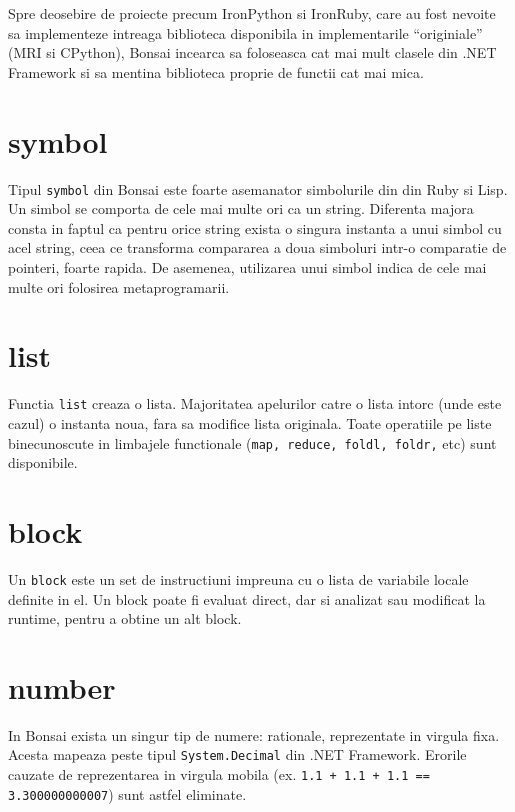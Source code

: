 \documentclass[12pt,a4paper]{memoir}
\begin{document}
Spre deosebire de proiecte precum IronPython si IronRuby, care au fost nevoite sa implementeze intreaga biblioteca disponibila in implementarile ``originiale'' (MRI si CPython), Bonsai incearca sa foloseasca cat mai mult clasele din .NET Framework si sa mentina biblioteca proprie de functii cat mai mica.

\section{symbol}

Tipul \texttt{symbol} din Bonsai este foarte asemanator simbolurile din din Ruby\cite{ruby_symbols} si Lisp\cite{clhs_symbols}. Un simbol se comporta de cele mai multe ori ca un string. Diferenta majora consta in faptul ca pentru orice string exista o singura instanta a unui simbol cu acel string, ceea ce transforma compararea a doua simboluri intr-o comparatie de pointeri, foarte rapida. De asemenea, utilizarea unui simbol indica de cele mai multe ori folosirea metaprogramarii. 

\section{list}

Functia \texttt{list} creaza o lista. Majoritatea apelurilor catre o lista intorc (unde este cazul) o instanta noua, fara sa modifice lista originala. Toate operatiile pe liste binecunoscute in limbajele functionale (\texttt{map, reduce, foldl, foldr,} etc) sunt disponibile.

\section{block}

Un \texttt{block} este un set de instructiuni impreuna cu o lista de variabile locale definite in el. Un block poate fi evaluat direct, dar si analizat sau modificat la runtime, pentru a obtine un alt block.

\section{number}

In Bonsai exista un singur tip de numere: rationale, reprezentate in virgula fixa. Acesta mapeaza peste tipul \texttt{System.Decimal} din .NET Framework. Erorile cauzate de reprezentarea in virgula mobila (ex. \texttt{1.1 + 1.1 + 1.1 == 3.300000000007}) sunt astfel eliminate.
\end{document}
